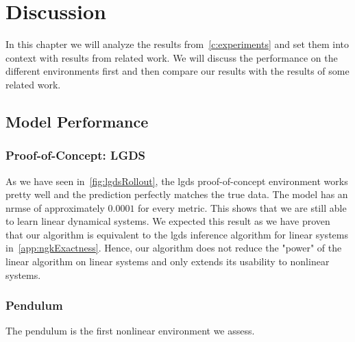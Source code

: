 \chapter{Discussion}
\label{c:discussion}



In this chapter we will analyze the results from~\autoref{c:experiments} and set them into context with results from related work. We will discuss the performance on the different environments first and then compare our results with the results of some related work.

\section{Model Performance}
	\subsection{Proof-of-Concept: LGDS}
		As we have seen in~\autoref{fig:lgdsRollout}, the \ac{lgds} proof-of-concept environment works pretty well and the prediction perfectly matches the true data. The model has an \ac{nrmse} of approximately \( 0.0001 \) for every metric. This shows that we are still able to learn linear dynamical systems. We expected this result as we have proven that our algorithm is equivalent to the \ac{lgds} inference algorithm for linear systems in~\autoref{app:ngkExactness}. Hence, our algorithm does not reduce the "power" of the linear algorithm on linear systems and only extends its usability to nonlinear systems.

	\subsection{Pendulum}
		\label{subsec:discussPendulum}

		The pendulum is the first nonlinear environment we assess.

